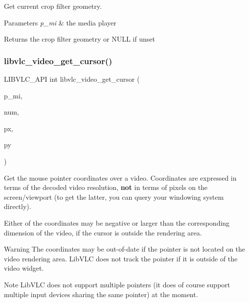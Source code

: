 Get current crop filter geometry.


\begin{DoxyParams}{Parameters}
{\em p\+\_\+mi} & the media player \\
\hline
\end{DoxyParams}
\begin{DoxyReturn}{Returns}
the crop filter geometry or N\+U\+LL if unset 
\end{DoxyReturn}
\mbox{\label{group__libvlc__video_gae9e67bc9137941aa621d3febf2ce95da}} 
\subsubsection{\texorpdfstring{libvlc\+\_\+video\+\_\+get\+\_\+cursor()}{libvlc\_video\_get\_cursor()}}
{\footnotesize\ttfamily L\+I\+B\+V\+L\+C\+\_\+\+A\+PI int libvlc\+\_\+video\+\_\+get\+\_\+cursor (\begin{DoxyParamCaption}\item[{libvlc\+\_\+media\+\_\+player\+\_\+t $\ast$}]{p\+\_\+mi,  }\item[{unsigned}]{num,  }\item[{int $\ast$}]{px,  }\item[{int $\ast$}]{py }\end{DoxyParamCaption})}

Get the mouse pointer coordinates over a video. Coordinates are expressed in terms of the decoded video resolution, {\bfseries not} in terms of pixels on the screen/viewport (to get the latter, you can query your windowing system directly).

Either of the coordinates may be negative or larger than the corresponding dimension of the video, if the cursor is outside the rendering area.

\begin{DoxyWarning}{Warning}
The coordinates may be out-\/of-\/date if the pointer is not located on the video rendering area. Lib\+V\+LC does not track the pointer if it is outside of the video widget.
\end{DoxyWarning}
\begin{DoxyNote}{Note}
Lib\+V\+LC does not support multiple pointers (it does of course support multiple input devices sharing the same pointer) at the moment.
\end{DoxyNote}

